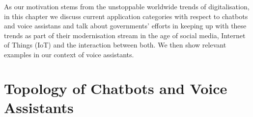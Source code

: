 


As our motivation stems from the unstoppable worldwide trends of digitalisation, in this chapter we discuss current application categories
with respect to chatbots and voice assistans
and talk about governments' efforts in keeping up with these trends as part of their 
modernisation stream
in the age of social media, Internet of Things (IoT) and the interaction between both.
We then show relevant examples in our context of voice assistants.




\section{Topology of Chatbots and Voice Assistants}


